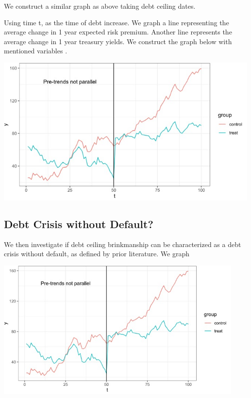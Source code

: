 \documentclass[
  12pt]{article}
\begin{document}
We construct a similar graph as above taking debt ceiling dates.

Using time t, as the time of debt increase. We graph a line representing
the average change in 1 year expected risk premium. Another line
represents the average change in 1 year treasury yields. We construct
the graph below with mentioned variables \citep{duarte2015}.

\includegraphics[width=5.21875in,height=\textheight]{style-guide/1_year_ERP_parallel_trends.jpeg}

\hypertarget{debt-crisis-without-default-1}{%
\subsection{Debt Crisis without
Default?}\label{debt-crisis-without-default-1}}

We then investigate if debt ceiling brinkmanship can be characterized as
a debt crisis without default, as defined by prior literature. We graph

\includegraphics[width=4.875in,height=\textheight]{style-guide/1_year_ERP_parallel_trends.jpeg}
\end{document}
